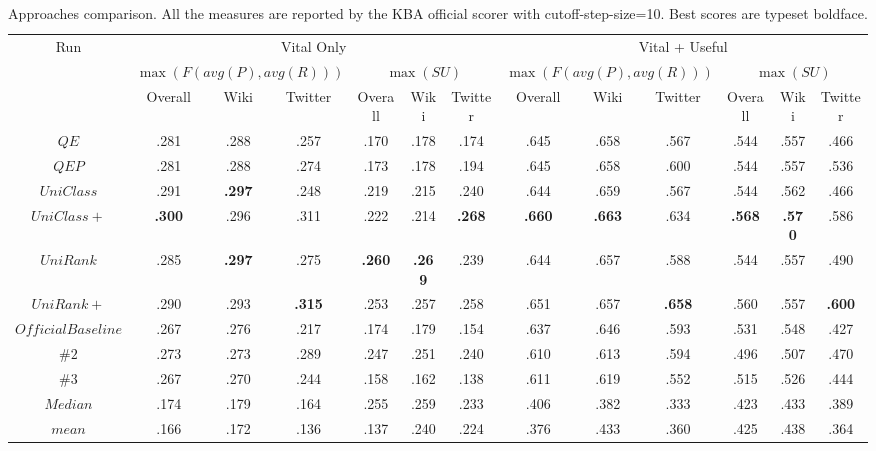 \documentclass{sig-alternate}
\begin{document}
\begin{table*}
\centering
\caption{Approaches comparison. All the measures are reported by the KBA official scorer with cutoff-step-size=10. Best scores are typeset boldface.}\label{tb:results}
\begin{tabular}{ccccccccccccc} \hline
\multirow{3}{*}{Run} & \multicolumn{6}{c}{Vital Only} & \multicolumn{6}{c}{Vital + Useful}\\ \cline{2-13}
& \multicolumn{3}{c}{$\max(F(avg(P), avg(R)))$} & \multicolumn{3}{c}{$\max(SU)$} & \multicolumn{3}{c}{$\max(F(avg(P), avg(R)))$} & \multicolumn{3}{c}{$\max(SU)$} \\ \cline{2-13}
& Overall & Wiki & Twitter & Overall & Wiki & Twitter & Overall & Wiki & Twitter & Overall & Wiki & Twitter \\\hline
$QE$ & .281 & .288 & .257 & .170 &.178 & .174 & .645 & .658 & .567 & .544 & .557 & .466 \\ 
$QEP$ & .281 & .288 & .274 & .173 & .178 & .194 & .645 & .658 & .600 & .544 &.557& .536 \\ \hline
$UniClass$ &.291 & \textbf{.297} & .248 & .219 & .215 & .240 & .644 & .659 & .567 & .544 & .562 & .466 \\ 
$UniClass+$  &\textbf{.300} & .296 & .311 & .222 & .214 & \textbf{.268} &\textbf{ .660} & \textbf{ .663} & .634 & \textbf{.568} & \textbf{.570} & .586 \\ \hline
$UniRank$ & .285 & \textbf{.297} & .275 & \textbf{.260} & \textbf{ .269} & .239 &  .644 &  .657 &  .588 &  .544 & .557 & .490\\ 
$UniRank+$ & .290 & .293 & \textbf{ .315} & .253 &.257 & .258 & .651 & .657 & \textbf{ .658} & .560 & .557 & \textbf{.600} \\ \hline
 \hline
$Official Baseline$ & .267 & .276 &  .217 & .174 & .179 & .154 & .637 & .646 & .593  &.531 & .548 & .427\\ 
$\# 2$ \cite{Dietz:2013:KBA} & .273 & .273 & .289 & .247 & .251 & .240 & .610 & .613 & .594 & .496 & .507 & .470 \\ 
$\# 3$ \cite{UdelFang:2013:KBA} & .267 & .270 & .244 & .158 & .162 & .138 & .611 & .619 & .552 & .515 & .526 & .444 \\ \hline
\hline
$Median$ & .174  & .179 & .164 & .255 & .259 & .233 & .406 & .382 & .333 & .423 &.433 & .389 \\ 
$mean$ & .166 & .172 & .136 & .137 & .240 & .224  & .376 & .433 & .360 & .425 & .438 & .364 \\ \hline
\end{tabular}
\end{table*}
\end{document}
